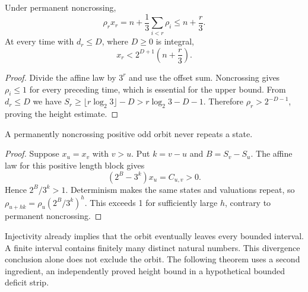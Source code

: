 \begin{lemma}\label{lem:height}
Under permanent noncrossing,
\begin{equation}\label{eq:normalized}
\rho_r x_r=n+\frac13\sum_{i<r}\rho_i\le n+\frac r3.
\end{equation}
At every time with $d_r\le D$, where $D\ge0$ is integral,
\begin{equation}\label{eq:height}
x_r<2^{D+1}\left(n+\frac r3\right).
\end{equation}
\end{lemma}
\begin{proof}
Divide the affine law by $3^r$ and use the offset sum. Noncrossing gives $\rho_i\le1$ for every preceding time, which is essential for the upper bound. From $d_r\le D$ we have $S_r\ge\lfloor r\log_2 3\rfloor-D>r\log_2 3-D-1$. Therefore $\rho_r>2^{-D-1}$, proving the height estimate.
\end{proof}

\begin{lemma}[Injectivity]\label{lem:injective}
A permanently noncrossing positive odd orbit never repeats a state.
\end{lemma}
\begin{proof}
Suppose $x_u=x_v$ with $v>u$. Put $k=v-u$ and $B=S_v-S_u$. The affine law for this positive length block gives
\[
(2^B-3^k)x_u=C_{u,v}>0.
\]
Hence $2^B/3^k>1$. Determinism makes the same states and valuations repeat, so
$\rho_{u+hk}=\rho_u(2^B/3^k)^h$. This exceeds 1 for sufficiently large $h$, contrary to permanent noncrossing.
\end{proof}

Injectivity already implies that the orbit eventually leaves every bounded interval. A finite interval contains finitely many distinct natural numbers. This divergence conclusion alone does not exclude the orbit. The following theorem uses a second ingredient, an independently proved height bound in a hypothetical bounded deficit strip.

